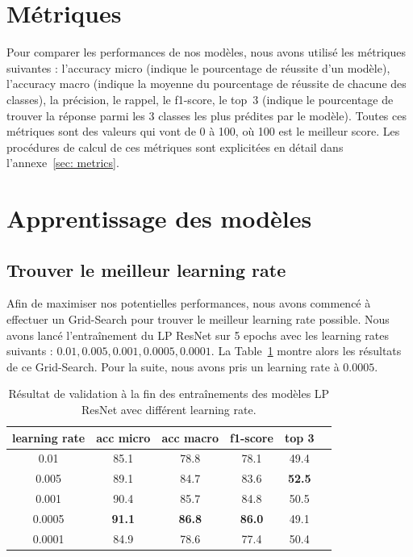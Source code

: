 \documentclass[a4paper]{article}
\begin{document}
\section{Métriques}
Pour comparer les performances de nos modèles, nous avons utilisé les métriques suivantes : l'accuracy micro (indique le pourcentage de réussite d'un modèle), l'accuracy macro (indique la moyenne du pourcentage de réussite de chacune des classes), la précision, le rappel, le f1-score, le top~3 (indique le pourcentage de trouver la réponse parmi les 3 classes les plus prédites par le modèle). Toutes ces métriques sont des valeurs qui vont de 0 à 100, où 100 est le meilleur score. 
Les procédures de calcul de ces métriques sont explicitées en détail dans l'annexe~\ref{sec: metrics}.

\section{Apprentissage des modèles}

\subsection{Trouver le meilleur learning rate}
Afin de maximiser nos potentielles performances, nous avons commencé à effectuer un Grid-Search pour trouver le meilleur learning rate possible. Nous avons lancé l'entraînement du LP ResNet sur 5 epochs avec les learning rates suivants : $0.01, 0.005, 0.001, 0.0005, 0.0001$. La Table~\ref{tab:gridsearch} montre alors les résultats de ce Grid-Search. Pour la suite, nous avons pris un learning rate à $0.0005$.

\begin{table}[ht]
    \centering
    \begin{tabular}{cccccc}
    \toprule
    learning rate & acc micro & acc macro & f1-score & top 3 \\
    \midrule
    0.01 & 85.1 & 78.8 & 78.1 & 49.4 \\
    0.005 & 89.1 & 84.7 & 83.6 & \textbf{52.5} \\
    0.001 & 90.4 & 85.7 & 84.8 & 50.5 \\
    0.0005 & \textbf{91.1} & \textbf{86.8} & \textbf{86.0} & 49.1 \\
    0.0001 & 84.9 & 78.6 & 77.4 & 50.4 \\
    \bottomrule
    \end{tabular}
    \caption{Résultat de validation à la fin des entraînements des modèles LP ResNet avec différent learning rate.}
    \label{tab:gridsearch}
\end{table}
\end{document}
